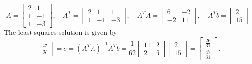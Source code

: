 \documentclass[a4paper, 9pt]{extarticle}
\begin{document}
$$
  A = \begin{bmatrix} 2 & 1 \\ 1 & -1 \\ 1 & -3 \end{bmatrix}, \quad
  A^T = \begin{bmatrix} 2 & 1 & 1 \\ 1 & -1 & -3 \end{bmatrix}, \quad
  A^T A = \begin{bmatrix} 6 & -2 \\ -2 & 11 \end{bmatrix}, \quad
  A^T b = \begin{bmatrix} 2 \\ 15 \end{bmatrix}
$$
The least squares solution is given by
$$
  \begin{bmatrix}
    x \\
    y
  \end{bmatrix}
  = c = (A^T A)^{-1} A^T b =
  \frac{1}{62}
  \begin{bmatrix}
    11 & 2 \\
    2  & 6
  \end{bmatrix}
  \begin{bmatrix}
    2 \\
    15
  \end{bmatrix}
  =
  \begin{bmatrix}
    \frac{26}{31} \\
    \frac{47}{31}
  \end{bmatrix}
  .
$$
\end{document}
